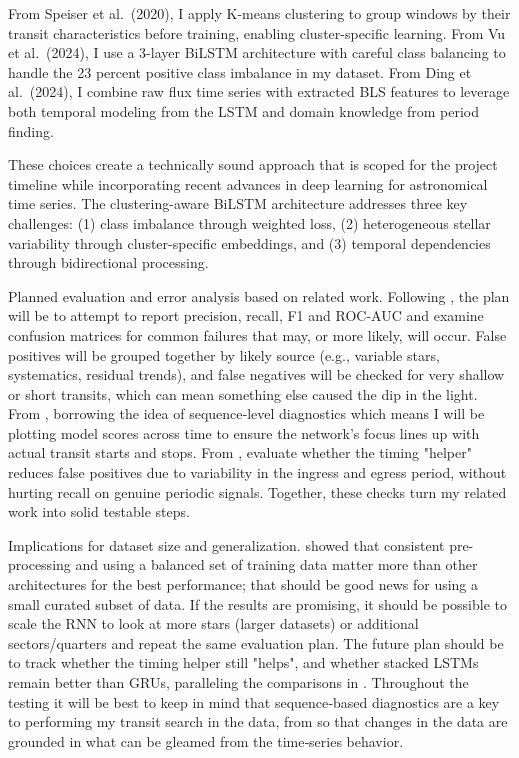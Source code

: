\documentclass[letterpaper]{article} %
\begin{document}
From Speiser et al.\ (2020), I apply K-means clustering to group windows by their transit characteristics before training, enabling cluster-specific learning. From Vu et al.\ (2024), I use a 3-layer BiLSTM architecture with careful class balancing to handle the 23 percent positive class imbalance in my dataset. From Ding et al.\ (2024), I combine raw flux time series with extracted BLS features to leverage both temporal modeling from the LSTM and domain knowledge from period finding.

These choices create a technically sound approach that is scoped for the project timeline while incorporating recent advances in deep learning for astronomical time series. The clustering-aware BiLSTM architecture addresses three key challenges: (1) class imbalance through weighted loss, (2) heterogeneous stellar variability through cluster-specific embeddings, and (3) temporal dependencies through bidirectional processing.

Planned evaluation and error analysis based on related work. Following \cite{Vida2021findingflaresrecurrent}, the plan will be to attempt to report precision, recall, F1 and ROC-AUC and examine confusion matrices for common failures that may, or more likely, will occur. False positives will be grouped together by likely source (e.g., variable stars, systematics, residual trends), and false negatives will be checked for very shallow or short transits, which can mean something else caused the dip in the light. From \cite{kugler2016explorativeapproachkepler}, borrowing the idea of sequence‑level diagnostics which means I will be plotting model scores across time to ensure the network's focus lines up with actual transit starts and stops. From \cite{Du2016markedtemporalpoint}, evaluate whether the timing "helper" reduces false positives due to variability in the ingress and egress period, without hurting recall on genuine periodic signals. Together, these checks turn my related work into solid testable steps.

Implications for dataset size and generalization. \cite{Vida2021findingflaresrecurrent} showed that consistent pre-processing and using a balanced set of training data matter more than other architectures for the best performance; that should be good news for using a small curated subset of data. If the results are promising, it should be possible to scale the RNN to look at more stars (larger datasets) or additional sectors/quarters and repeat the same evaluation plan. The future plan should be to track whether the timing helper still "helps", and whether stacked LSTMs remain better than GRUs, paralleling the comparisons in \cite{Vida2021findingflaresrecurrent}. Throughout the testing it will be best to keep in mind that sequence‑based diagnostics are a key to performing my transit search in the data, from \cite{kugler2016explorativeapproachkepler} so that changes in the data are grounded in what can be gleamed from the time‑series behavior.
\end{document}
